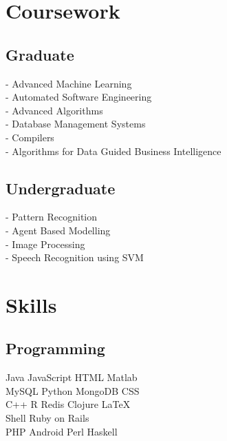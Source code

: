 \documentclass[]{bigfatnoob-resume}
\begin{document}
\begin{minipage}[t]{0.33\textwidth}

\section{Coursework}
\subsection{Graduate}
- Advanced Machine Learning \\
- Automated Software Engineering \\
- Advanced Algorithms \\
- Database Management Systems \\
- Compilers \\
- Algorithms for Data Guided Business Intelligence\\


\sectionsep

\subsection{Undergraduate}
- Pattern Recognition \\
- Agent Based Modelling \\
- Image Processing \\
- Speech Recognition using SVM\\
\sectionsep


\section{Skills}
\subsection{Programming}
Java \textbullet{} JavaScript\textbullet{} HTML \textbullet{} Matlab \\
MySQL \textbullet{} Python \textbullet{} MongoDB \textbullet{} CSS \\ 
C++ \textbullet{} R \textbullet{} Redis \textbullet{} Clojure \textbullet{} \LaTeX\ \\ 
\textbullet{} Shell \textbullet{} Ruby on Rails\\
PHP \textbullet{} Android \textbullet{} Perl \textbullet{} Haskell
\sectionsep


\end{minipage}
\end{document}
